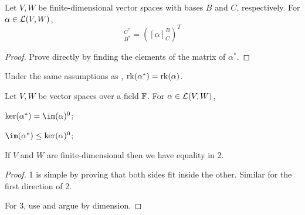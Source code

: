 \documentclass[../Main.tex]{subfiles}
\begin{document}
\begin{proposition}
    Let $V, W$ be finite-dimensional vector spaces with bases $B$ and $C$, respectively. For $\alpha \in \mathcal{L}(V, W)$,
    \begin{equation*}
        [\alpha^*]^{C^*}_{B^*} = \left([\alpha]^B_C\right)^T
    \end{equation*}
    \label{propDLMMatrix}
\end{proposition}
\begin{proof}
    Prove directly by finding the elements of the matrix of $\alpha^*$.
\end{proof}
\begin{corollary}
    Under the same assumptions as , $\operatorname{rk}(\alpha^*) = \operatorname{rk}(\alpha)$.
    \label{corDLMSameRank}
\end{corollary}
\begin{propositions}{
        Let $V, W$ be vector spaces over a field $\mathbb{F}$. For $\alpha\in\mathcal{L}(V, W)$,
        \label{propDLMKernel}
    }
    \item $\ker(\alpha^*) = \im(\alpha)^0$; \label{propDualKernel}
    \item $\im(\alpha^*) \leq \ker(\alpha)^0$; \label{propDualImage}
    \item If $V$ and $W$ are finite-dimensional then we have equality in 2. \label{propDualImageFinite}
\end{propositions}
\begin{proof}
    1 is simple by proving that both sides fit inside the other. Similar for the first direction of 2.

    For 3, use  and argue by dimension.
\end{proof}
\end{document}
